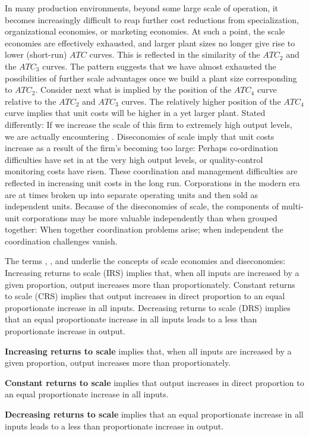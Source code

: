 

\newhtmlpage

In many production environments, beyond some large scale of operation, it
becomes increasingly difficult to reap further cost reductions from
specialization, organizational economies, or marketing economies. At such a
point, the scale economies are effectively exhausted, and larger plant sizes
no longer give rise to lower (short-run) $ATC$ curves. This is reflected in the
similarity of the $ATC_{2}$ and the $ATC_{3}$ curves. The pattern suggests
that we have almost exhausted the possibilities of further scale advantages once we
build a plant size corresponding to $ATC_{2}$. Consider next what is implied by the
position of the $ATC_{4}$ curve relative to the $ATC_{2}$ and $ATC_{3}$
curves. The relatively higher position of the $ATC_{4}$ curve implies that
unit costs will be higher in a yet larger plant. Stated differently: If we
increase the scale of this firm to extremely high output levels, we are
actually encountering . Diseconomies of
scale imply that unit costs increase as a result of the firm's becoming too
large: Perhaps co-ordination difficulties have set in at the very high
output levels, or quality-control monitoring costs have risen. These
coordination and management difficulties are reflected in increasing unit
costs in the long run. Corporations in the modern era are at times broken up
into separate operating units and then sold as independent units. Because of
the diseconomies of scale, the components of multi-unit corporations may be
more valuable independently than when grouped together: When together
coordination problems arise; when independent the coordination challenges
vanish.

The terms , , and 
 underlie the concepts of scale
economies and diseconomies: Increasing returns to scale (IRS) implies that,
when all inputs are increased by a given proportion, output increases more
than proportionately. Constant returns to scale (CRS) implies that output
increases in direct proportion to an equal proportionate increase in all
inputs. Decreasing returns to scale (DRS) implies that an equal
proportionate increase in all inputs leads to a less than proportionate
increase in output.

\begin{DefBox}
	\textbf{Increasing returns to scale} implies that, when all inputs are increased by a given proportion, output increases more than proportionately. 
	
	\textbf{Constant returns to scale} implies that output increases in direct proportion to an equal proportionate increase in all inputs.
	
	\textbf{Decreasing returns to scale} implies that an equal proportionate increase in all inputs leads to a less than proportionate increase in output.
\end{DefBox}

